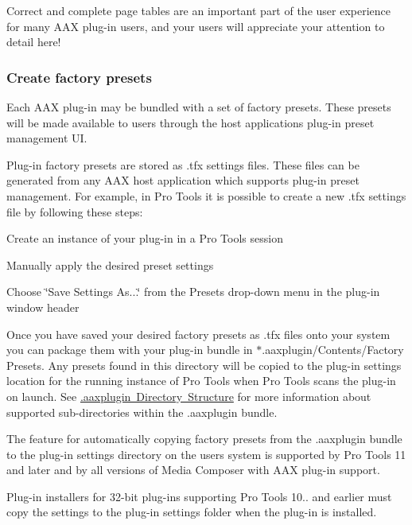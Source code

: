  Correct and complete page tables are an important part of the user experience for many A\+AX plug-\/in users, and your users will appreciate your attention to detail here!

\hypertarget{a00843_aax_distributing_finishing_factorypresets}{}\subsubsection{Create factory presets}\label{a00843_aax_distributing_finishing_factorypresets}
 Each A\+AX plug-\/in may be bundled with a set of factory presets. These presets will be made available to users through the host application\textquotesingle{}s plug-\/in preset management UI.

 Plug-\/in factory presets are stored as .tfx settings files. These files can be generated from any A\+AX host application which supports plug-\/in preset management. For example, in Pro Tools it is possible to create a new .tfx settings file by following these steps\+:

 
\begin{DoxyEnumerate}
\item Create an instance of your plug-\/in in a Pro Tools session  
\item Manually apply the desired preset settings  
\item Choose \char`\"{}\+Save Settings As...\char`\"{} from the Presets drop-\/down menu in the plug-\/in window header  
\end{DoxyEnumerate}

 Once you have saved your desired factory presets as .tfx files onto your system you can package them with your plug-\/in bundle in $\ast$.aaxplugin/\+Contents/\+Factory Presets. Any presets found in this directory will be copied to the plug-\/in settings location for the running instance of Pro Tools when Pro Tools scans the plug-\/in on launch. See \mbox{\hyperlink{a00801_commoninterface_formatspecification__aaxplugin_directory_structure}{.aaxplugin Directory Structure}} for more information about supported sub-\/directories within the .aaxplugin bundle.

 The feature for automatically copying factory presets from the .aaxplugin bundle to the plug-\/in settings directory on the user\textquotesingle{}s system is supported by Pro Tools 11 and later and by all versions of Media Composer with A\+AX plug-\/in support.

 Plug-\/in installers for 32-\/bit plug-\/ins supporting Pro Tools 10.. and earlier must copy the settings to the plug-\/in settings folder when the plug-\/in is installed.

